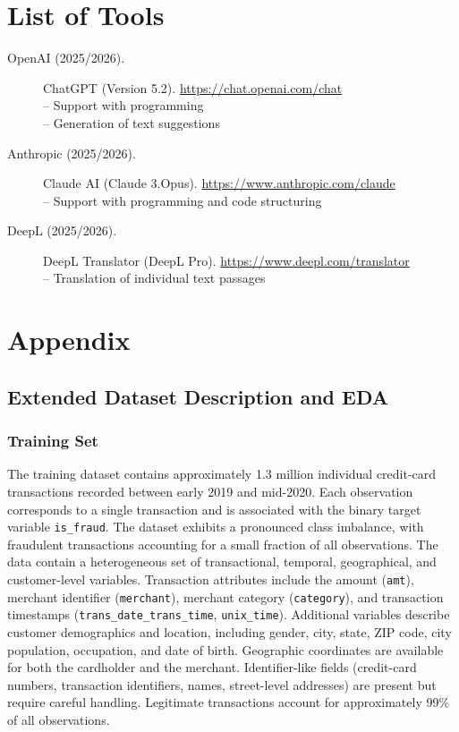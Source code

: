 \documentclass[oneside,12pt,parskip=half,american,numbers=noenddot]{scrreprt}
\begin{document}
\printbibliography
{} %


\chapter*{List of Tools}
\begin{description}
  \item[OpenAI (2025/2026).] ChatGPT (Version 5.2). \url{https://chat.openai.com/chat} \\
  – Support with programming \\
  – Generation of text suggestions

  \item[Anthropic (2025/2026).] Claude AI (Claude 3.Opus). \url{https://www.anthropic.com/claude} \\
  – Support with programming and code structuring

  \item[DeepL (2025/2026).] DeepL Translator (DeepL Pro). \url{https://www.deepl.com/translator} \\
  – Translation of individual text passages
\end{description}


\appendix
\chapter{Appendix}

\section{Extended Dataset Description and EDA}
\label{app:eda}

\subsection*{Training Set}
The training dataset contains approximately 1.3 million individual credit-card transactions recorded between early 2019 and mid-2020. Each observation corresponds to a single transaction and is associated with the binary target variable \texttt{is\_fraud}. The dataset exhibits a pronounced class imbalance, with fraudulent transactions accounting for a small fraction of all observations. The data contain a heterogeneous set of transactional, temporal, geographical, and customer-level variables. Transaction attributes include the amount (\texttt{amt}), merchant identifier (\texttt{merchant}), merchant category (\texttt{category}), and transaction timestamps (\texttt{trans\_date\_trans\_time}, \texttt{unix\_time}). Additional variables describe customer demographics and location, including gender, city, state, ZIP code, city population, occupation, and date of birth. Geographic coordinates are available for both the cardholder and the merchant. Identifier-like fields (credit-card numbers, transaction identifiers, names, street-level addresses) are present but require careful handling. Legitimate transactions account for approximately 99\% of all observations.
\end{document}
